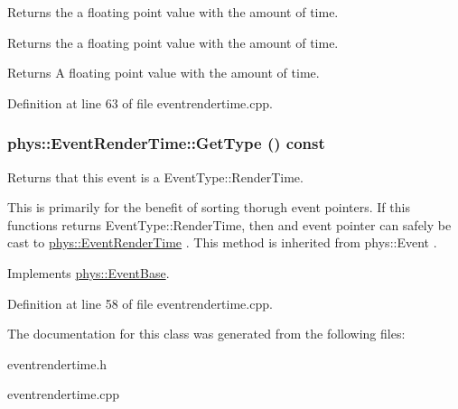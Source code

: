 Returns the a floating point value with the amount of time. 

Returns the a floating point value with the amount of time. \begin{DoxyReturn}{Returns}
A floating point value with the amount of time. 
\end{DoxyReturn}


Definition at line 63 of file eventrendertime.cpp.

\hypertarget{classphys_1_1EventRenderTime_a160ca55bf9e5a2ae80dab82eab88baf5}{
\subsubsection[{GetType}]{ phys::EventRenderTime::GetType () const}}
\label{d3/d8b/classphys_1_1EventRenderTime_a160ca55bf9e5a2ae80dab82eab88baf5}


Returns that this event is a EventType::RenderTime. 

This is primarily for the benefit of sorting thorugh event pointers. If this functions returns EventType::RenderTime, then and event pointer can safely be cast to \hyperlink{classphys_1_1EventRenderTime}{phys::EventRenderTime} . This method is inherited from phys::Event . 

Implements \hyperlink{classphys_1_1EventBase_a1b3d29b6ecf30f18cc3e1825a515c508}{phys::EventBase}.



Definition at line 58 of file eventrendertime.cpp.



The documentation for this class was generated from the following files:\begin{DoxyCompactItemize}
\item 
eventrendertime.h\item 
eventrendertime.cpp\end{DoxyCompactItemize}
